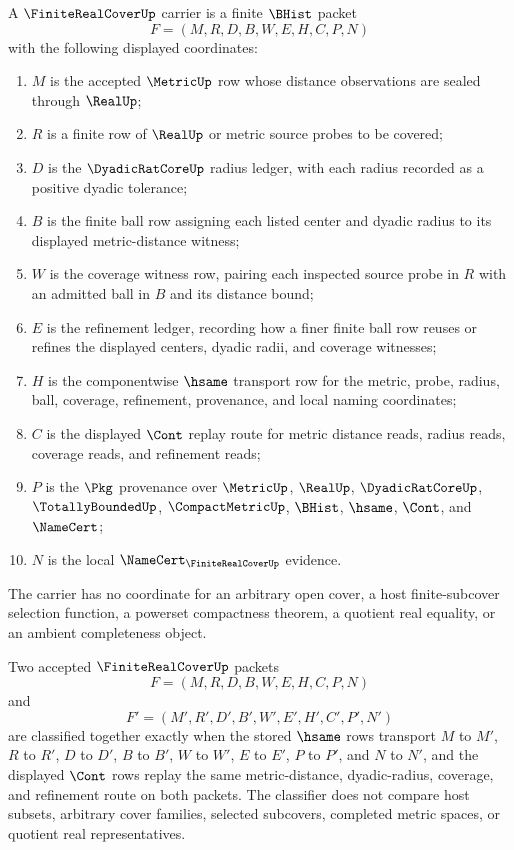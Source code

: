 \begin{definition}
\label{def:finite-real-cover-carrier}
A $\FiniteRealCoverUp$ carrier is a finite $\BHist$ packet
$$
F=(M,R,D,B,W,E,H,C,P,N)
$$
with the following displayed coordinates:
\begin{enumerate}
\item $M$ is the accepted $\MetricUp$ row whose distance observations are sealed through $\RealUp$;
\item $R$ is a finite row of $\RealUp$ or metric source probes to be covered;
\item $D$ is the $\DyadicRatCoreUp$ radius ledger, with each radius recorded as a positive dyadic tolerance;
\item $B$ is the finite ball row assigning each listed center and dyadic radius to its displayed metric-distance witness;
\item $W$ is the coverage witness row, pairing each inspected source probe in $R$ with an admitted ball in $B$ and its distance bound;
\item $E$ is the refinement ledger, recording how a finer finite ball row reuses or refines the displayed centers, dyadic radii, and coverage witnesses;
\item $H$ is the componentwise $\hsame$ transport row for the metric, probe, radius, ball, coverage, refinement, provenance, and local naming coordinates;
\item $C$ is the displayed $\Cont$ replay route for metric distance reads, radius reads, coverage reads, and refinement reads;
\item $P$ is the $\Pkg$ provenance over $\MetricUp$, $\RealUp$, $\DyadicRatCoreUp$, $\TotallyBoundedUp$, $\CompactMetricUp$, $\BHist$, $\hsame$, $\Cont$, and $\NameCert$;
\item $N$ is the local $\NameCert_{\FiniteRealCoverUp}$ evidence.
\end{enumerate}
The carrier has no coordinate for an arbitrary open cover, a host finite-subcover selection function, a powerset compactness theorem, a quotient real equality, or an ambient completeness object.
\end{definition}

\begin{definition}
\label{def:finite-real-cover-classifier}
Two accepted $\FiniteRealCoverUp$ packets
$$
F=(M,R,D,B,W,E,H,C,P,N)
$$
and
$$
F'=(M',R',D',B',W',E',H',C',P',N')
$$
are classified together exactly when the stored $\hsame$ rows transport $M$ to $M'$, $R$ to $R'$, $D$ to $D'$, $B$ to $B'$, $W$ to $W'$, $E$ to $E'$, $P$ to $P'$, and $N$ to $N'$, and the displayed $\Cont$ rows replay the same metric-distance, dyadic-radius, coverage, and refinement route on both packets. The classifier does not compare host subsets, arbitrary cover families, selected subcovers, completed metric spaces, or quotient real representatives.
\end{definition}

